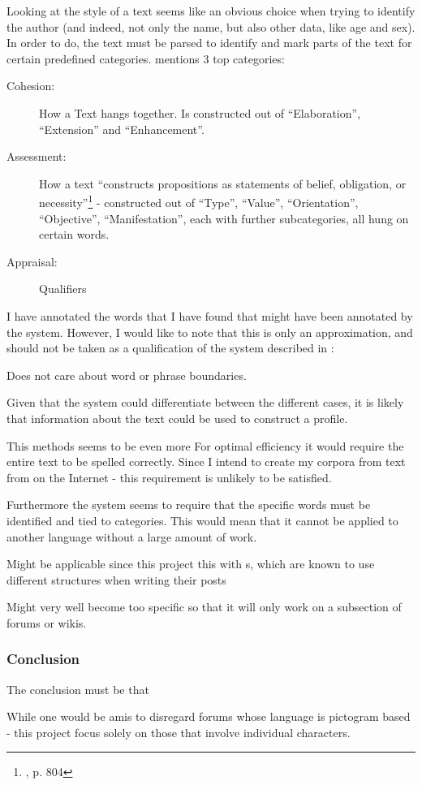 {
Looking at the style of a text seems like an obvious choice when trying to identify the author (and indeed, not only the name, but also other data, like age and sex). In order to do, the text must be parsed to identify and mark parts of the text for certain predefined categories. \cite{style} mentions 3 top categories: 
\begin{description}
\item[Cohesion:] How a Text hangs together. Is constructed out of ``Elaboration'', ``Extension'' and ``Enhancement''.
\item[Assessment:] How a text ``constructs propositions as statements of belief, obligation, or necessity''\footnote{\cite{style}, p. 804} - constructed out of  ``Type'', ``Value'', ``Orientation'', ``Objective'', ``Manifestation'', each with further subcategories, all hung on certain words.
\item[Appraisal:] Qualifiers
\end{description}
}
{
I have annotated the words that I have found that might have been annotated by the system. However, I would like to note that this is only an approximation, and should not be taken as a qualification of the system described in \cite{style}:
}
{
\item Does not care about word or phrase boundaries.
\item Given that the system could differentiate between the different cases, it is likely that information about the text could be used to construct a profile.
}{
\item This methods seems to be even more For optimal efficiency it would require the entire text to be spelled correctly. Since I intend to create my corpora from text from \forum on the Internet - this requirement is unlikely to be satisfied.
\item Furthermore the system seems to require that the specific words must be identified and tied to categories. This would mean that it cannot be applied to another language without a large amount of work.
} 

{

}
{
}
{
\item Might be applicable since this project this with \forum s, which are known to use different structures when writing their posts
}{
\item Might very well become too specific so that it will only work on a subsection of forums or wikis.
}

\subsubsection{Conclusion}
The conclusion must be that

While one would be amis to disregard forums whose language is pictogram based - this project focus solely on those that involve individual characters. 
